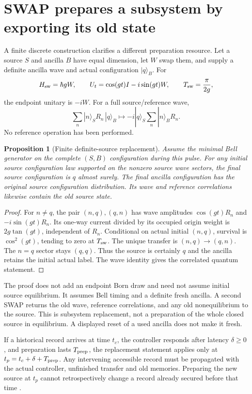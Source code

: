 \documentclass[11pt,oneside,openany]{book}
\newtheorem{proposition}[theorem]{Proposition}
\theoremstyle{definition}
\theoremstyle{remark}\newtheorem{remark}[theorem]{Remark}
\begin{document}
\section{SWAP prepares a subsystem by exporting its old state}

A finite discrete construction clarifies a different preparation resource.
Let a source $S$ and ancilla $B$ have equal dimension, let $W$ swap them,
and supply a definite ancilla wave and actual configuration $|q\rangle_B$.
For
\[
 H_{\rm sw}=\hbar gW,\qquad
 U_t=\cos(gt)I-i\sin(gt)W,\qquad
 T_{\rm sw}=\frac{\pi}{2g},
\]
the endpoint unitary is $-iW$. For a full source/reference wave,
\[
 \sum_n|n\rangle_S R_n\,|q\rangle_B
 \longmapsto-i|q\rangle_S\sum_n|n\rangle_B R_n.
\]
No reference operation has been performed.

\begin{proposition}[Finite definite-source replacement]\label{prep:swap}
Assume the minimal Bell generator on the complete $(S,B)$ configuration
during this pulse. For any initial source configuration law supported on
the nonzero source wave sectors, the final source configuration is $q$
almost surely. The final ancilla configuration has the original source
configuration distribution. Its wave and reference correlations likewise
contain the old source state.
\end{proposition}
\begin{proof}
For $n\ne q$, the pair $(n,q),(q,n)$ has wave amplitudes
$\cos(gt)R_n$ and $-i\sin(gt)R_n$.
Its one-way current divided by its occupied origin weight is
$2g\tan(gt)$, independent of $R_n$. Conditional on actual initial
$(n,q)$, survival is $\cos^2(gt)$, tending to zero at $T_{\rm sw}$.
The unique transfer is $(n,q)\to(q,n)$. The $n=q$ sector stays
$(q,q)$. Thus the source is certainly $q$ and the ancilla retains the
initial actual label. The wave identity gives the correlated quantum
statement.
\end{proof}
The proof does not add an endpoint Born draw and need not assume
initial source equilibrium. It assumes Bell timing and a definite fresh
ancilla. A second SWAP returns the old wave, reference correlations, and
any old nonequilibrium to the source. This is subsystem replacement,
not a preparation of the whole closed source in equilibrium. A displayed
reset of a used ancilla does not make it fresh.

If a historical record arrives at time $t_c$, the controller responds
after latency $\delta\geq0$, and preparation lasts $T_{\rm prep}$,
the replacement statement applies only at
$t_p=t_c+\delta+T_{\rm prep}$. Any intervening accessible record must
be propagated with the actual controller, unfinished transfer and old
memories. Preparing the new source at $t_p$ cannot retrospectively
change a record already secured before that time \cite{C01}.
\end{document}
